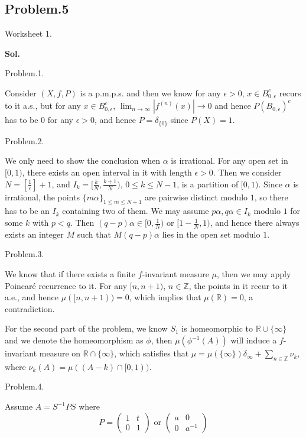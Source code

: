 \documentclass[lang=en,11pt,a4paper,citestyle =authoryear]{elegantpaper}
\newcommand{\Z}{\mathbb{Z}}
\newcommand{\R}{\mathbb{R}}
\begin{document}
\subsection*{Problem.5}
Worksheet 1.\par
\vspace{0.5em}
\textbf{Sol.} \par
Problem.1.\par
Consider $(X,f,P)$ is a p.m.p.s. and then we know for any $\epsilon > 0$, $x\in B_{0,\epsilon}^c$ recurs to it a.s., but for any $x\in B_{0,\epsilon}^c$, $\lim_{n\to\infty} |f^{(n)}(x)| \to 0$ and hence $P(B_{0,\epsilon})^c$ has to be 0 for any $\epsilon > 0$, and hence $P = \delta_{\{0\}}$ since $P(X) = 1$.\par
Problem.2.\par
We only need to show the conclusion when $\alpha$ is irrational. For any open set in $[0,1)$, there exists an open interval in it with length $\epsilon > 0$. Then we consider $N = [\tfrac{1}{\epsilon}]+1$, and $I_k = [\tfrac{k}{N}, \tfrac{k+1}{N})$, $0 \leq k \leq N-1$, is a partition of $[0,1)$. Since $\alpha$ is irrational, the points $\{m\alpha\}_{1\leq m \leq N+1}$ are pairwise distinct modulo $1$, so there has to be an $I_k$ containing two of them. We may assume $p\alpha,q\alpha \in I_k$ modulo $1$ for some $k$ with $p<q$. Then $(q-p)\alpha \in [0,\tfrac{1}{N})$ or $[1-\tfrac{1}{N},1)$, and hence there always exists an integer $M$ such that $M(q-p)\alpha$ lies in the open set modulo $1$.\par
Problem.3.\par
We know that if there exists a finite $f$-invariant measure $\mu$, then we may apply Poincar\'e recurrence to it. For any $[n,n+1)$, $n\in\Z$, the points in it recur to it a.e., and hence $\mu([n,n+1)) = 0$, which implies that $\mu(\R) = 0$, a contradiction.\par
For the second part of the problem, we know $S_1$ is homeomorphic to $\R\cup\{\infty\}$ and we denote the homeomorphism as $\phi$, then $\mu(\phi^{-1}(A))$ will induce a $f$-invariant measure on $\R\cap\{\infty\}$, which satisfies that $\mu = \mu(\{\infty\})\delta_{\infty} + \sum\limits_{n\in\Z} \nu_k$, where $\nu_k(A) = \mu((A-k)\cap[0,1))$.\par
Problem.4.\par
Assume $A = S^{-1}PS$ where
\[P=\left(\begin{array}{c|c} 1 & t \\ 0 & 1\end{array}\right)\text{ or }\left(\begin{array}{c|c} a & 0 \\ 0 & a^{-1}\end{array}\right)
\]
\end{document}
